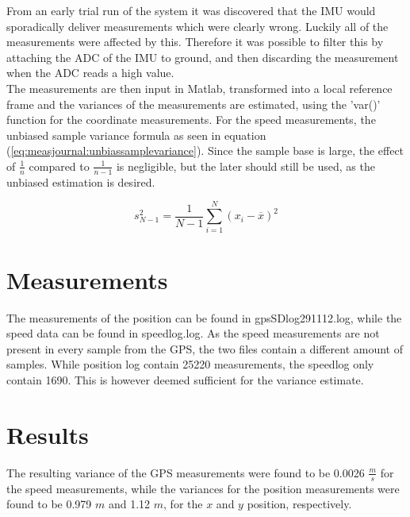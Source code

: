 From an early trial run of the system it was discovered that the IMU would sporadically deliver measurements which were clearly wrong. Luckily all of the measurements were affected by this. Therefore it was possible to filter this by attaching the ADC of the IMU to ground, and then discarding the measurement when the ADC reads a high value.\\
The measurements are then input in Matlab, transformed into a local reference frame and the variances of the measurements are estimated, using the 'var()' function for the coordinate measurements. For the speed measurements, the unbiased sample variance formula as seen in equation (\ref{eq:measjournal:unbiassamplevariance}). Since the sample base is large, the effect of $\frac{1}{n}$ compared to $\frac{1}{n-1}$ is negligible, but the later should still be used, as the unbiased estimation is desired.

\begin{equation}
s^2_{N-1} = \frac{1}{N-1} \sum^N_{i=1}(x_i-\overline{x})^2
\end{equation}
\label{eq:measjournal:unbiassamplevariance}
\section{Measurements}
The measurements of the position can be found in gpsSDlog291112.log, while the speed data can be found in speedlog.log. As the speed measurements are not present in every sample from the GPS, the two files contain a different amount of samples. While position log contain 25220 measurements, the speedlog only contain 1690. This is however deemed sufficient for the variance estimate.
\section{Results}
The resulting variance of the GPS measurements were found to be 0.0026 $\frac{m}{s}$ for the speed measurements, while the variances for the position measurements were found to be 0.979 $m$ and 1.12 $m$, for the $x$ and $y$ position, respectively.